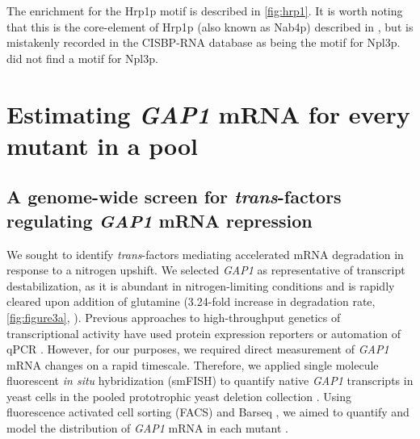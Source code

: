 The enrichment for the Hrp1p motif is described in \autoref{fig:hrp1}.
It is worth noting that this is the core-element of Hrp1p (also known
as Nab4p) described in \cite{guisbert2005functional,chen1998specific}, 
but is mistakenly recorded in the CISBP-RNA database as being the 
motif for Npl3p. 
\cite{guisbert2005functional} did not find a motif for Npl3p.


\section{Estimating \textit{GAP1} mRNA for every mutant in a pool}

\subsection{A genome-wide screen for \textit{trans}-factors 
  regulating \textit{GAP1} mRNA repression}

We sought to identify \textit{trans}-factors mediating accelerated mRNA
degradation in response to a nitrogen upshift. We selected \textit{GAP1} 
as representative of transcript destabilization, as it is abundant in
nitrogen-limiting conditions and is rapidly cleared upon addition of
glutamine  (3.24-fold increase in degradation rate, \autoref{fig:figure3a},
). Previous approaches to high-throughput
genetics of transcriptional activity have used protein expression
reporters \parencite{neklesa2009genome,sliva2016barcode} or automation of qPCR 
\parencite{worley2016genome}. However, for our
purposes, we required direct measurement of \textit{GAP1} mRNA 
changes on a rapid timescale.
Therefore, we applied single molecule fluorescent \textit{in situ}
hybridization (smFISH) to quantify 
native \textit{GAP1} transcripts in yeast cells in the pooled
prototrophic yeast deletion collection \parencite{vandersluis2014broad}.
Using fluorescence activated cell sorting (FACS) and Barseq
\parencite{smith2009quantitative,robinson2014design,giaever2014yeast},
we aimed to quantify and model the distribution of \textit{GAP1} mRNA
in each mutant \parencite{kinney2010using,peterman2016sort}.


